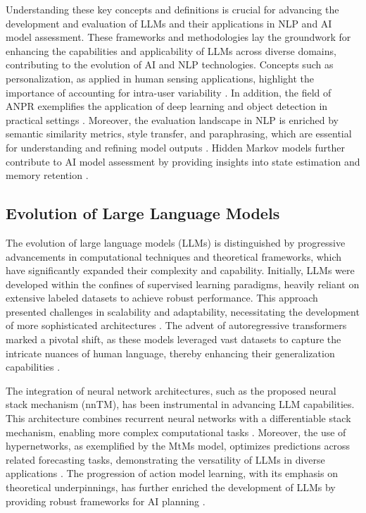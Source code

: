 Understanding these key concepts and definitions is crucial for advancing the development and evaluation of LLMs and their applications in NLP and AI model assessment. These frameworks and methodologies lay the groundwork for enhancing the capabilities and applicability of LLMs across diverse domains, contributing to the evolution of AI and NLP technologies. Concepts such as personalization, as applied in human sensing applications, highlight the importance of accounting for intra-user variability \cite{kaur2024cropcontextwiserobuststatic}. In addition, the field of ANPR exemplifies the application of deep learning and object detection in practical settings \cite{adak2022automaticnumberplaterecognition}. Moreover, the evaluation landscape in NLP is enriched by semantic similarity metrics, style transfer, and paraphrasing, which are essential for understanding and refining model outputs \cite{yamshchikov2020styletransferparaphraselookingsensible}. Hidden Markov models further contribute to AI model assessment by providing insights into state estimation and memory retention \cite{lathouwers2017memorypaysdiscordhidden}.



\subsection{Evolution of Large Language Models} \label{subsec:Evolution of Large Language Models}



The evolution of large language models (LLMs) is distinguished by progressive advancements in computational techniques and theoretical frameworks, which have significantly expanded their complexity and capability. Initially, LLMs were developed within the confines of supervised learning paradigms, heavily reliant on extensive labeled datasets to achieve robust performance. This approach presented challenges in scalability and adaptability, necessitating the development of more sophisticated architectures \cite{aineto2024actionmodellearningguarantees}. The advent of autoregressive transformers marked a pivotal shift, as these models leveraged vast datasets to capture the intricate nuances of human language, thereby enhancing their generalization capabilities \cite{stogin2022provablystableneuralnetwork}.



The integration of neural network architectures, such as the proposed neural stack mechanism (nnTM), has been instrumental in advancing LLM capabilities. This architecture combines recurrent neural networks with a differentiable stack mechanism, enabling more complex computational tasks \cite{stogin2022provablystableneuralnetwork}. Moreover, the use of hypernetworks, as exemplified by the MtMs model, optimizes predictions across related forecasting tasks, demonstrating the versatility of LLMs in diverse applications \cite{stank2024designingtimeseriesmodelshypernetworks}. The progression of action model learning, with its emphasis on theoretical underpinnings, has further enriched the development of LLMs by providing robust frameworks for AI planning \cite{aineto2024actionmodellearningguarantees}.



